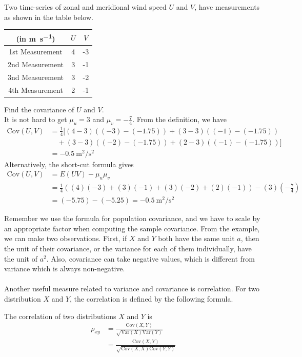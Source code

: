 \begin{exmp}
Two time-series of zonal and meridional wind speed $U$ and $V$, have measurements as shown in the table below.
\begin{center}
\begin{tabular}{|c|c|c|}
\hline
(in \si{\m \per \s}) & $U$ & $V$\\
\hline
1st Measurement & 4 & -3 \\
\hline
2nd Measurement & 3 & -1 \\
\hline
3nd Measurement & 3 & -2 \\
\hline
4th Measurement & 2 & -1 \\
\hline
\end{tabular}
\end{center}
Find the covariance of $U$ and $V$.\\
It is not hard to get $\mu_u = 3$ and $\mu_v = -\frac{7}{4}$. From the definition, we have
\begin{align*}
\text{Cov}(U,V) &= \frac{1}{4} [(4-3)((-3)-(-1.75))+(3-3)((-1)-(-1.75)) \\
&\quad+(3-3)((-2)-(-1.75))+(2-3)((-1)-(-1.75))] \\
&= \SI{-0.5}{\square\m \per \square\s}
\end{align*}
Alternatively, the short-cut formula gives
\begin{align*}
\text{Cov}(U,V) &= E(UV) - \mu_u \mu_v \\
&= \frac{1}{4}((4)(-3) + (3)(-1) + (3)(-2) + (2)(-1)) - (3)(-\frac{7}{4}) \\
&= (-5.75) - (-5.25) = \SI{-0.5}{\square\m \per \square\s}
\end{align*}
\end{exmp}
Remember we use the formula for population covariance, and we have to scale by an appropriate factor when computing the sample covariance. From the example, we can make two observations. First, if $X$ and $Y$ both have the same unit $a$, then the unit of their covariance, or the variance for each of them individually, have the unit of $a^2$. Also, covariance can take negative values, which is different from variance which is always non-negative.\\
\\
Another useful measure related to variance and covariance is correlation. For two distribution $X$ and $Y$, the correlation is defined by the following formula.
\begin{defn}
The correlation of two distributions $X$ and $Y$ is
\begin{align*}
\rho_{xy} &= \frac{\text{Cov}(X,Y)}{\sqrt{\text{Var}(X) \text{Var}(Y)}} \\
&= \frac{\text{Cov}(X,Y)}{\sqrt{\text{Cov}(X,X) \text{Cov}(Y,Y)}}
\end{align*}
\end{defn}
